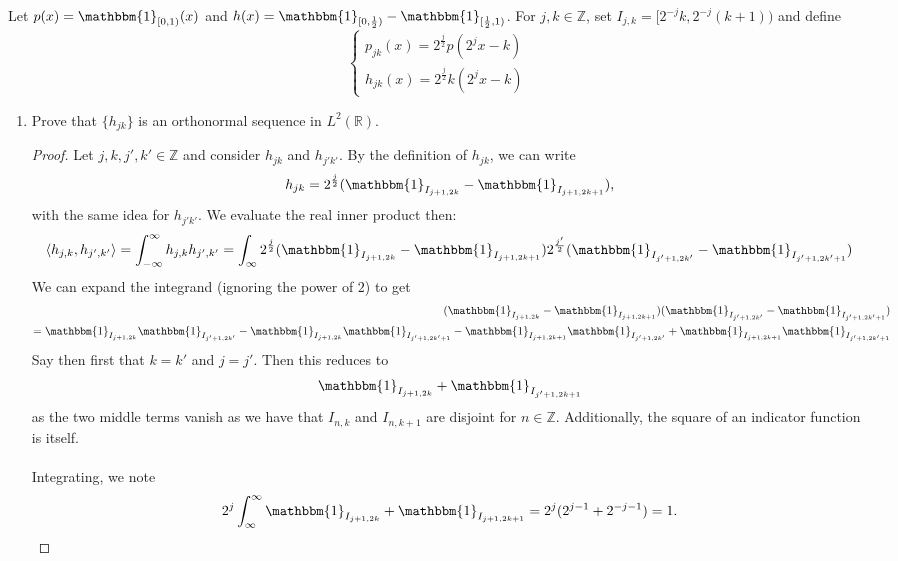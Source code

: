 \documentclass[12pt]{article}
\newenvironment{ex}[2][Exercise]{\begin{trivlist}
\item[\hskip \labelsep {\bfseries #1}\hskip \labelsep {\bfseries #2.}]}{\end{trivlist}}
\begin{document}
\begin{ex}{14}
    Let $p(x) = \mathbbm{1}_{[0,1)}(x)$ and $h(x) = \mathbbm{1}_{[0, \frac{1}{2})} -\mathbbm{1}_{[\frac{1}{2}, 1)}$. For $j, k \in \mathbb{Z}$, set $I_{j,k} = [2^{-j}k, 2^{-j}(k + 1))$ and define 
    \begin{equation*}
        \begin{cases}
            p_{jk}(x) = 2^{\frac{j}{2}}p(2^jx - k) \\
            h_{jk}(x) = 2^{\frac{j}{2}}k(2^jx - k)
        \end{cases}
    \end{equation*}
    \begin{enumerate}
        \item Prove that $\{h_{jk}\}$ is an orthonormal sequence in $L^2(\mathbb{R})$.
        \begin{proof}
            Let $j, k, j', k' \in \mathbb{Z}$ and consider $h_{jk}$ and $h_{j'k'}$. By the definition of $h_{jk}$, we can write 
            $$h_{jk} = 2^{\frac{j}{2}} (\mathbbm{1}_{I_{j + 1, 2k}} - \mathbbm{1}_{I_{j + 1, 2k + 1}}),$$
            with the same idea for $h_{j'k'}$. We evaluate the real inner product then:
            $$\langle h_{j,k}, h_{j',k'} \rangle = \int_{-\infty}^\infty h_{j,k}h_{j',k'} = \int_{\infty} 2^{\frac{j}{2}} (\mathbbm{1}_{I_{j + 1, 2k}} - \mathbbm{1}_{I_{j + 1, 2k + 1}})2^{\frac{j'}{2}} (\mathbbm{1}_{I_{j' + 1, 2k'}} - \mathbbm{1}_{I_{j' + 1, 2k' + 1}})$$
            We can expand the integrand (ignoring the power of $2$) to get 
            \begin{align*}
                (\mathbbm{1}_{I_{j + 1, 2k}} - \mathbbm{1}_{I_{j + 1, 2k + 1}})(\mathbbm{1}_{I_{j' + 1, 2k'}} - \mathbbm{1}_{I_{j' + 1, 2k' + 1}}) \\ = \mathbbm{1}_{I_{j + 1, 2k}}\mathbbm{1}_{I_{j' + 1, 2k'}} - \mathbbm{1}_{I_{j + 1, 2k}}\mathbbm{1}_{I_{j' + 1, 2k' + 1}} - \mathbbm{1}_{I_{j + 1, 2k + 1}}\mathbbm{1}_{I_{j' + 1, 2k'}} + \mathbbm{1}_{I_{j + 1, 2k + 1}}\mathbbm{1}_{I_{j' + 1, 2k' + 1}}
            \end{align*}
            Say then first that $k = k'$ and $j = j'$. Then this reduces to 
            $$\mathbbm{1}_{I_{j + 1, 2k}} + \mathbbm{1}_{I_{j' + 1, 2k + 1}}$$
            as the two middle terms vanish as we have that $I_{n,k}$ and $I_{n,k + 1}$ are disjoint for $n \in \mathbb{Z}$. Additionally, the square of an indicator function is itself. \\ \\  
            Integrating, we note
            $$2^j\int_\infty^\infty \mathbbm{1}_{I_{j + 1, 2k}} + \mathbbm{1}_{I_{j + 1, 2k + 1}} = 2^j(2^{j - 1} + 2^{-j - 1}) = 1.$$

\end{proof}
\end{enumerate}
\end{ex}
\end{document}
